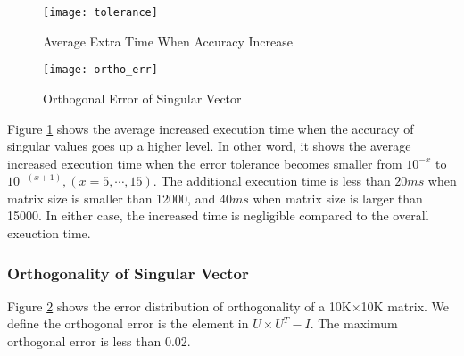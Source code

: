 \begin{figure}[t]
\vspace{-0.1in}
\centering
\texttt{[image: tolerance]}
\vspace{-0.1in}
\caption{Average Extra Time When Accuracy Increase}
\label{fig:tolerance}
\vspace{-0.1in}
\end{figure}
\begin{figure}[hbpt]
\vspace{-0.1in}
\centering
\texttt{[image: ortho\_err]}
\vspace{-0.1in}
\caption{Orthogonal Error of Singular Vector}
\label{fig:ortho_err}
\vspace{-0.1in}
\end{figure}
Figure \ref{fig:tolerance} shows the average increased execution time when the accuracy of singular values goes up a higher level.
In other word, it shows the average increased execution time when the error tolerance becomes smaller from $10^{-x}$ to $10^{-(x+1)}, (x=5,\cdots,15)$.
The additional execution time is less than $20 ms$ when matrix size is smaller than 12000, and $40 ms$ when matrix size is larger than 15000.
In either case, the increased time is negligible compared to the overall exeuction time.

\subsubsection{Orthogonality of Singular Vector}
Figure \ref{fig:ortho_err} shows the error distribution of orthogonality of a 10K$\times$10K matrix. We define the orthogonal error is the element in $U\times U^T - I$. The maximum orthogonal error is less than 0.02.
